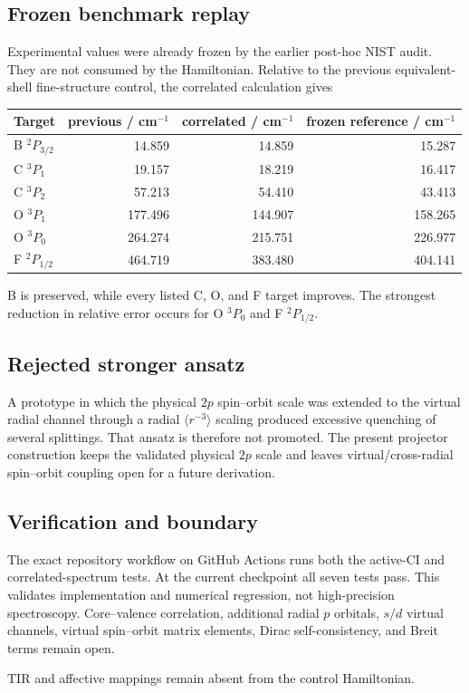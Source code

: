 \subsection{Frozen benchmark replay}
Experimental values were already frozen by the earlier post-hoc NIST audit.  They are not consumed by the Hamiltonian.  Relative to the previous equivalent-shell fine-structure control, the correlated calculation gives
\begin{center}
\begin{tabular}{lrrr}
\hline
Target & previous / cm$^{-1}$ & correlated / cm$^{-1}$ & frozen reference / cm$^{-1}$\\
\hline
B $^2P_{3/2}$ & 14.859 & 14.859 & 15.287\\
C $^3P_1$ & 19.157 & 18.219 & 16.417\\
C $^3P_2$ & 57.213 & 54.410 & 43.413\\
O $^3P_1$ & 177.496 & 144.907 & 158.265\\
O $^3P_0$ & 264.274 & 215.751 & 226.977\\
F $^2P_{1/2}$ & 464.719 & 383.480 & 404.141\\
\hline
\end{tabular}
\end{center}
B is preserved, while every listed C, O, and F target improves.  The strongest reduction in relative error occurs for O $^3P_0$ and F $^2P_{1/2}$.

\subsection{Rejected stronger ansatz}
A prototype in which the physical $2p$ spin--orbit scale was extended to the virtual radial channel through a radial $\langle r^{-3}\rangle$ scaling produced excessive quenching of several splittings.  That ansatz is therefore not promoted.  The present projector construction keeps the validated physical $2p$ scale and leaves virtual/cross-radial spin--orbit coupling open for a future derivation.

\subsection{Verification and boundary}
The exact repository workflow on GitHub Actions runs both the active-CI and correlated-spectrum tests.  At the current checkpoint all seven tests pass.  This validates implementation and numerical regression, not high-precision spectroscopy.  Core--valence correlation, additional radial $p$ orbitals, $s/d$ virtual channels, virtual spin--orbit matrix elements, Dirac self-consistency, and Breit terms remain open.

TIR and affective mappings remain absent from the control Hamiltonian.
